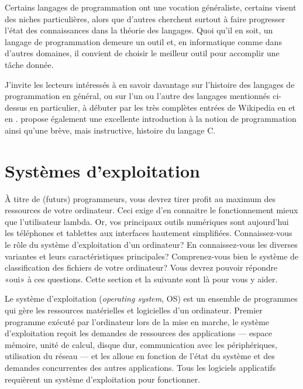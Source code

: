 Certains langages de programmation ont une vocation généraliste,
certains visent des niches particulières, alors que d'autres cherchent
surtout à faire progresser l'état des connaissances dans la théorie
des langages. Quoi qu'il en soit, un langage de programmation demeure
un outil et, en informatique comme dans d'autres domaines, il convient
de choisir le meilleur outil pour accomplir une tâche donnée.

J'invite les lecteurs intéressés à en savoir davantage sur
l'histoire des langages de programmation en général, ou sur l'un ou
l'autre des langages mentionnés ci-dessus en particulier, à débuter
par les très complètes entrées de Wikipedia en
et en
.
\citet[chapitre~2]{Oualline:C:1997} propose également une excellente
introduction à la notion de programmation ainsi qu'une brève, mais
instructive, histoire du langage C.


\section{Systèmes d'exploitation}
\label{sec:informatique:os}

À titre de (futurs) programmeurs, vous devrez tirer profit au maximum
des ressources de votre ordinateur. Ceci exige d'en connaitre le
fonctionnement mieux que l'utilisateur lambda. Or, vos principaux
outils numériques sont aujourd'hui les téléphones et tablettes aux
interfaces hautement simplifiées. Connaissez-vous le rôle du
système d'exploitation d'un ordinateur? En connaissez-vous les
diverses variantes et leurs caractéristiques principales?
Comprenez-vous bien le système de classification des fichiers de votre
ordinateur? Vous devrez pouvoir répondre «oui» à ces questions. Cette
section et la suivante sont là pour vous y aider.

Le système d'exploitation
(\emph{operating system}, OS) est un ensemble de programmes qui gère
les ressources matérielles et logicielles d'un ordinateur. Premier
programme exécuté par l'ordinateur lors de la mise en marche, le
système d'exploitation reçoit les demandes de ressources des
applications --- espace mémoire, unité de calcul, disque dur,
communication avec les périphériques, utilisation du réseau --- et les
alloue en fonction de l'état du système et des demandes concurrentes
des autres applications. Tous les logiciels applicatifs requièrent un
système d'exploitation pour fonctionner.

